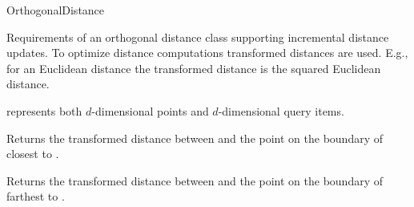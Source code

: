 

\begin{ccRefConcept}{OrthogonalDistance}


\ccDefinition
  
Requirements of an orthogonal distance class supporting incremental distance updates.
To optimize distance computations transformed distances are used. 
E.g., for an Euclidean distance the transformed distance is the squared Euclidean distance.

\ccRefines


\ccParameters


 represents both $d$-dimensional points and
$d$-dimensional query items.


\ccTypes


\ccCreation
{}  %


\ccOperations


{Returns the transformed distance between  and
the point on the boundary of  closest to .}

{Returns the transformed distance between  and
the point on the boundary of  farthest to .}


\end{ccRefConcept}

